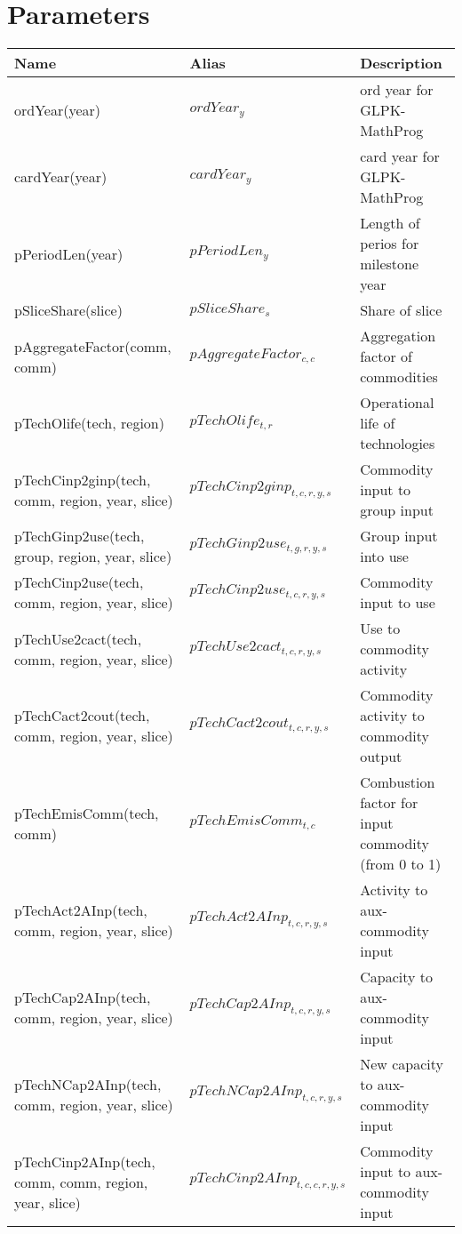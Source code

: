 \documentclass{article}
\begin{document}
\section*{Parameters}
\begin{longtable}{|p{10cm}|p{5cm}|p{9cm}|}
\hline
\bf{Name} & \bf{Alias}  & \bf{Description} \\ 
 \hline
ordYear(year) & $ordYear_{y}$ & ord year for GLPK-MathProg \\ 
 \hline
cardYear(year) & $cardYear_{y}$ & card year for GLPK-MathProg \\ 
 \hline
pPeriodLen(year) & $pPeriodLen_{y}$ & Length of perios for milestone year \\ 
 \hline
pSliceShare(slice) & $pSliceShare_{s}$ & Share of slice \\ 
 \hline
pAggregateFactor(comm, comm) & $pAggregateFactor_{c,c}$ & Aggregation factor of commodities \\ 
 \hline
pTechOlife(tech, region) & $pTechOlife_{t,r}$ & Operational life of technologies \\ 
 \hline
pTechCinp2ginp(tech, comm, region, year, slice) & $pTechCinp2ginp_{t,c,r,y,s}$ & Commodity input to group input \\ 
 \hline
pTechGinp2use(tech, group, region, year, slice) & $pTechGinp2use_{t,g,r,y,s}$ & Group input into use \\ 
 \hline
pTechCinp2use(tech, comm, region, year, slice) & $pTechCinp2use_{t,c,r,y,s}$ & Commodity input to use \\ 
 \hline
pTechUse2cact(tech, comm, region, year, slice) & $pTechUse2cact_{t,c,r,y,s}$ & Use to commodity activity \\ 
 \hline
pTechCact2cout(tech, comm, region, year, slice) & $pTechCact2cout_{t,c,r,y,s}$ & Commodity activity to commodity output \\ 
 \hline
pTechEmisComm(tech, comm) & $pTechEmisComm_{t,c}$ & Combustion factor for input commodity (from 0 to 1) \\ 
 \hline
pTechAct2AInp(tech, comm, region, year, slice) & $pTechAct2AInp_{t,c,r,y,s}$ & Activity to aux-commodity input \\ 
 \hline
pTechCap2AInp(tech, comm, region, year, slice) & $pTechCap2AInp_{t,c,r,y,s}$ & Capacity to aux-commodity input \\ 
 \hline
pTechNCap2AInp(tech, comm, region, year, slice) & $pTechNCap2AInp_{t,c,r,y,s}$ & New capacity to aux-commodity input \\ 
 \hline
pTechCinp2AInp(tech, comm, comm, region, year, slice) & $pTechCinp2AInp_{t,c,c,r,y,s}$ & Commodity input to aux-commodity input \\ 

\end{longtable}
\end{document}
